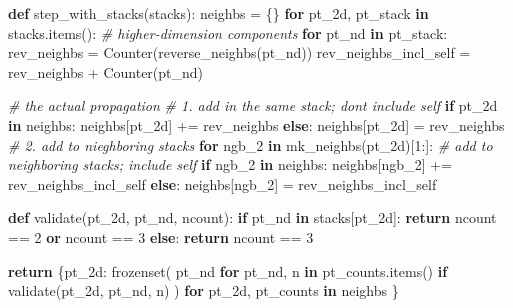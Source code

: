 \documentclass[]{article}
\newenvironment{Shaded}{}{}
\newcommand{\BuiltInTok}[1]{#1}
\newcommand{\CommentTok}[1]{\textcolor[rgb]{0.38,0.63,0.69}{\textit{#1}}}
\newcommand{\ControlFlowTok}[1]{\textcolor[rgb]{0.00,0.44,0.13}{\textbf{#1}}}
\newcommand{\DecValTok}[1]{\textcolor[rgb]{0.25,0.63,0.44}{#1}}
\newcommand{\KeywordTok}[1]{\textcolor[rgb]{0.00,0.44,0.13}{\textbf{#1}}}
\newcommand{\NormalTok}[1]{#1}
\newcommand{\OperatorTok}[1]{\textcolor[rgb]{0.40,0.40,0.40}{#1}}
\begin{document}
\begin{Shaded}
\begin{Highlighting}[]
\KeywordTok{def}\NormalTok{ step\_with\_stacks(stacks):}
\NormalTok{    neighbs }\OperatorTok{=}\NormalTok{ \{\}}
    \ControlFlowTok{for}\NormalTok{ pt\_2d, pt\_stack }\KeywordTok{in}\NormalTok{ stacks.items():}
        \CommentTok{\# higher{-}dimension components}
        \ControlFlowTok{for}\NormalTok{ pt\_nd }\KeywordTok{in}\NormalTok{ pt\_stack:}
\NormalTok{            rev\_neighbs }\OperatorTok{=}\NormalTok{ Counter(reverse\_neighbs(pt\_nd))}
\NormalTok{            rev\_neighbs\_incl\_self }\OperatorTok{=}\NormalTok{ rev\_neighbs }\OperatorTok{+}\NormalTok{ Counter(pt\_nd)}

            \CommentTok{\# the actual propagation}
            \CommentTok{\# 1. add in the same stack; don\textquotesingle{}t include self}
            \ControlFlowTok{if}\NormalTok{ pt\_2d }\KeywordTok{in}\NormalTok{ neighbs:}
\NormalTok{                neighbs[pt\_2d] }\OperatorTok{+=}\NormalTok{ rev\_neighbs}
            \ControlFlowTok{else}\NormalTok{:}
\NormalTok{                neighbs[pt\_2d] }\OperatorTok{=}\NormalTok{ rev\_neighbs}
            \CommentTok{\# 2. add to nieghboring stacks}
            \ControlFlowTok{for}\NormalTok{ ngb\_2 }\KeywordTok{in}\NormalTok{ mk\_neighbs(pt\_2d)[}\DecValTok{1}\NormalTok{:]:}
                \CommentTok{\# add to neighboring stacks; include self}
                \ControlFlowTok{if}\NormalTok{ ngb\_2 }\KeywordTok{in}\NormalTok{ neighbs:}
\NormalTok{                    neighbs[ngb\_2] }\OperatorTok{+=}\NormalTok{ rev\_neighbs\_incl\_self}
                \ControlFlowTok{else}\NormalTok{:}
\NormalTok{                    neighbs[ngb\_2] }\OperatorTok{=}\NormalTok{ rev\_neighbs\_incl\_self}

    \KeywordTok{def}\NormalTok{ validate(pt\_2d, pt\_nd, ncount):}
        \ControlFlowTok{if}\NormalTok{ pt\_nd }\KeywordTok{in}\NormalTok{ stacks[pt\_2d]:}
            \ControlFlowTok{return}\NormalTok{ ncount }\OperatorTok{==} \DecValTok{2} \KeywordTok{or}\NormalTok{ ncount }\OperatorTok{==} \DecValTok{3}
        \ControlFlowTok{else}\NormalTok{:}
            \ControlFlowTok{return}\NormalTok{ ncount }\OperatorTok{==} \DecValTok{3}

    \ControlFlowTok{return}\NormalTok{ \{pt\_2d: }\BuiltInTok{frozenset}\NormalTok{(}
\NormalTok{                       pt\_nd }\ControlFlowTok{for}\NormalTok{ pt\_nd, n }\KeywordTok{in}\NormalTok{ pt\_counts.items()}
                             \ControlFlowTok{if}\NormalTok{ validate(pt\_2d, pt\_nd, n)}
\NormalTok{                   )}
              \ControlFlowTok{for}\NormalTok{ pt\_2d, pt\_counts }\KeywordTok{in}\NormalTok{ neighbs}
\NormalTok{           \}}
\end{Highlighting}
\end{Shaded}
\end{document}

